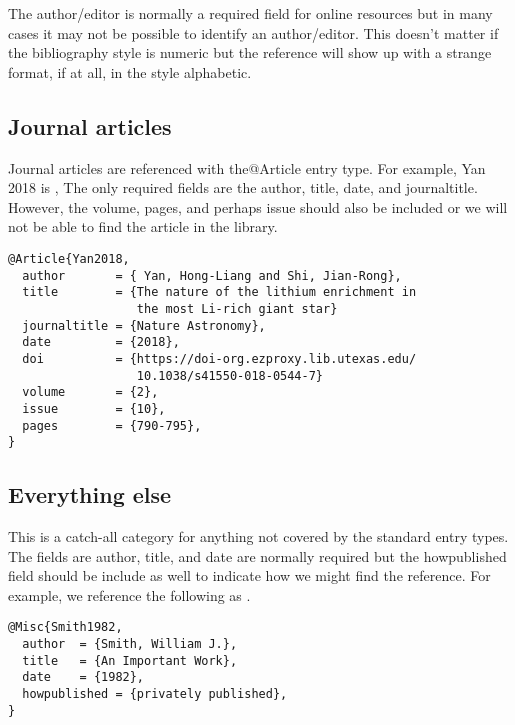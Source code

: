 \documentclass{article}
\begin{document}
The author/editor is normally a required field for online resources
but in many cases it may not be possible to identify an
author/editor. This doesn't matter if the bibliography style is
{\ttfamily numeric} but the reference will show up with a strange
format, if at all, in the style {\ttfamily alphabetic}.

\subsection{Journal articles}

Journal articles are referenced with the{\ttfamily @Article} entry
type.  For example, Yan 2018 is \cite{Yan2018}, The only required
fields are the {\ttfamily author}, {\ttfamily title}, {\ttfamily
  date}, and {\ttfamily journaltitle}.  However, the {\ttfamily
  volume}, {\ttfamily pages}, and perhaps {\ttfamily issue} should
also be included or we will not be able to find the article in the
library.

\begin{verbatim}
@Article{Yan2018,
  author       = { Yan, Hong-Liang and Shi, Jian-Rong},
  title        = {The nature of the lithium enrichment in
                  the most Li-rich giant star}
  journaltitle = {Nature Astronomy},
  date         = {2018},
  doi          = {https://doi-org.ezproxy.lib.utexas.edu/
                  10.1038/s41550-018-0544-7}
  volume       = {2},
  issue        = {10},
  pages        = {790-795},
}

\end{verbatim}

\subsection{Everything else}
This is a catch-all category for anything not covered by the standard
entry types.  The fields are {\ttfamily author}, {\ttfamily title},
and {\ttfamily date} are normally required but the {\ttfamily
  howpublished} field should be include as well to indicate how
we might find the reference. For example, we reference the following
as \cite{Smith1982}.

\begin{verbatim}
@Misc{Smith1982,
  author  = {Smith, William J.},
  title   = {An Important Work},
  date    = {1982},
  howpublished = {privately published},
}
\end{verbatim}

\printbibliography

\vfil\eject
\end{document}
